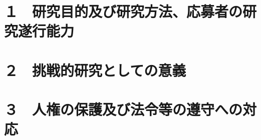 \documentclass[10pt,a4j,dvipdfmx]{jarticle} 					%
\newcommand{\研究課題名}{象の卵}
\newcommand{\研究機関名}{逢坂大学}
\newcommand{\研究代表者氏名}{湯川秀樹}
\newcommand{\研究期間の最終元号年度}{6}  %
\begin{document}

\section{１　研究目的及び研究方法、応募者の研究遂行能力}

\JSPSInstructions	%

%
%



\section{２　挑戦的研究としての意義}

%




\section{３　人権の保護及び法令等の遵守への対応}

%



\end{document}
